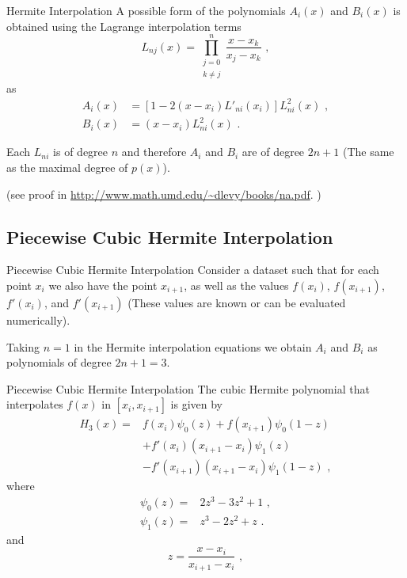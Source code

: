 \documentclass[11pt]{beamer}
\begin{document}
\begin{frame}[fragile]{Hermite Interpolation}
A possible form of the polynomials $A_i(x)$ and $B_i(x)$ is obtained using the Lagrange interpolation terms
\begin{equation}
L_{nj}(x) = \prod_{\substack{j = 0\\k\ne j}}^{n} \frac{x-x_k}{x_j - x_k}\,\,,
\end{equation}
as
\begin{equation}
\begin{array}{ll}
A_i(x) & = [ 1-2(x-x_i)L'_{ni}(x_i)]L_{ni}^2(x)\,\,,\\
B_i(x) & = (x-x_i) L_{ni}^2 (x)\,\,.
\end{array}
\end{equation}

\pause

Each $L_{ni}$ is of degree $n$ and therefore $A_i$ and $B_i$
are of degree $2n+1$ (The same as the maximal degree of $p(x)$). \\
\bigskip

\tiny
(see proof in
\url{http://www.math.umd.edu/~dlevy/books/na.pdf}. ) 

\end{frame}


\subsection{Piecewise Cubic Hermite Interpolation}
\begin{frame}[fragile]{Piecewise Cubic Hermite  Interpolation}
Consider a dataset such that for each point $x_i$
we also have the point $x_{i+1}$, as well as  the values $f(x_i)$, $f(x_{i+1})$, $f'(x_i)$, and
$f'(x_{i+1})$ (These values are known or can be evaluated numerically).

\bigskip
\pause

Taking $n=1$ in the Hermite interpolation equations we obtain  $A_i$ and $B_i$ as polynomials of degree $2n+1=3$.

\end{frame}

\begin{frame}[fragile]{Piecewise Cubic Hermite  Interpolation}
The cubic Hermite polynomial that interpolates $f(x)$ in $[x_i,x_{i+1}]$
is  given by
\begin{equation}
\begin{aligned}
H_3(x) =& f(x_i)\psi_0(z) + f(x_{i+1})\psi_0(1-z) \nonumber\\
& + f'(x_i)(x_{i+1} - x_{i})\psi_1(z) \nonumber \\ 
& - f'(x_{i+1})(x_{i+1}-x_i)\psi_1 (1-z)\,\,, 
\end{aligned}
\end{equation}
where 
\begin{align}
\psi_0(z) =&2z^3 - 3z^2 + 1\,\,,\\
\psi_1(z) =&z^3-2z^2+z\,\,.
\end{align}
and
\begin{equation}
z = \frac{x-x_i}{x_{i+1}-x_i}\,\,,
\end{equation}
\end{frame}
\end{document}
